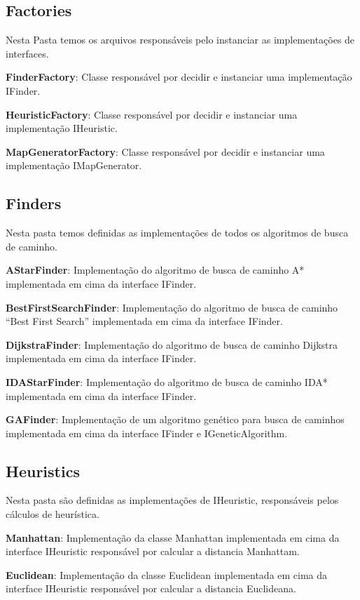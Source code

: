 \subsection{Factories}

Nesta Pasta temos os arquivos responsáveis pelo instanciar as implementações de interfaces.

\textbf{FinderFactory}: Classe responsável por decidir e instanciar uma implementação IFinder.

\textbf{HeuristicFactory}: Classe responsável por decidir e instanciar uma implementação IHeuristic.

\textbf{MapGeneratorFactory}: Classe responsável por decidir e instanciar uma implementação IMapGenerator.

\subsection{Finders}

Nesta pasta temos definidas as implementações de todos os algoritmos de busca de caminho.

\textbf{AStarFinder}: Implementação do algoritmo de busca de caminho A* implementada em cima da interface IFinder.

\textbf{BestFirstSearchFinder}: Implementação do algoritmo de busca de caminho “Best First Search” implementada em cima da interface IFinder.

\textbf{DijkstraFinder}: Implementação do algoritmo de busca de caminho Dijkstra implementada em cima da interface IFinder.

\textbf{IDAStarFinder}: Implementação do algoritmo de busca de caminho IDA* implementada em cima da interface IFinder.

\textbf{GAFinder}: Implementação de um algoritmo genético para busca de caminhos implementada em cima da interface IFinder e IGeneticAlgorithm.

\subsection{Heuristics}

Nesta pasta são definidas as implementações de IHeuristic, responsáveis pelos cálculos de heurística.

\textbf{Manhattan}: Implementação da classe Manhattan implementada em cima da interface IHeuristic responsável por calcular a distancia Manhattam.

\textbf{Euclidean}: Implementação da classe Euclidean implementada em cima da interface IHeuristic responsável por calcular a distancia Euclideana.

